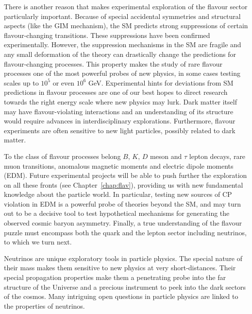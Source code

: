 \documentclass[../report.tex]{subfiles}
\begin{document}
There is another reason that makes experimental exploration of the flavour sector particularly important. Because of special accidental symmetries and structural aspects (like the GIM mechanism), the SM predicts strong suppressions of certain  flavour-changing transitions. These suppressions have been confirmed experimentally. However, the suppression mechanisms in the SM are fragile and any small deformation of the theory can drastically change the predictions for flavour-changing processes. This property makes the study of rare flavour processes one of the most powerful probes of new physics, in some cases testing scales up to $10^5$ or even $10^6$ GeV.  Experimental hints for deviations from SM predictions in flavour processes are one of our best hopes to direct research towards the right energy scale where new physics may lurk. Dark matter itself may have flavour-violating interactions and an understanding of its structure would require advances in interdisciplinary explorations. Furthermore, flavour experiments are often sensitive to new light particles, possibly related to dark matter.

To the class of flavour processes belong $B$, $K$, $D$ meson and $\tau$ lepton decays, rare muon transitions, anomalous magnetic moments and electric dipole moments (EDM). Future experimental projects will be able to push further the exploration on all these fronts (see Chapter~\ref{chap:flav}), providing us with new fundamental knowledge about the particle world. In particular, testing new sources of CP violation in EDM is a powerful probe of theories beyond the SM, and may turn out to be a decisive tool to test hypothetical mechanisms for generating the observed cosmic baryon asymmetry.
Finally, a true understanding of the flavour puzzle must encompass both the quark and the lepton sector including neutrinos, to which we turn next. 

\medskip
{}

\smallskip
\noindent
Neutrinos are unique exploratory tools in particle physics. The special nature of their mass makes them sensitive to new physics at very short-distances. Their special propagation properties make them a penetrating probe into the far structure of the Universe and a precious instrument to peek into the dark sectors of the cosmos. Many intriguing open questions in particle physics are linked to the properties of neutrinos.
\end{document}
